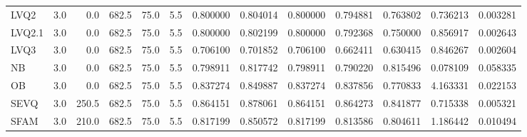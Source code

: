 \begin{table}[H]
\begin{tabular}{lrrrrrrrrrrrr}
LVQ2      &                3.0 &                   0.0 &       682.5 &       75.0 &     5.5 &  0.800000 &   0.804014 &  0.800000 &  0.794881 &  0.763802 &    0.736213 &   0.003281 \\
LVQ2.1    &                3.0 &                   0.0 &       682.5 &       75.0 &     5.5 &  0.800000 &   0.802199 &  0.800000 &  0.792368 &  0.750000 &    0.856917 &   0.002643 \\
LVQ3      &                3.0 &                   0.0 &       682.5 &       75.0 &     5.5 &  0.706100 &   0.701852 &  0.706100 &  0.662411 &  0.630415 &    0.846267 &   0.002604 \\
NB        &                3.0 &                   0.0 &       682.5 &       75.0 &     5.5 &  0.798911 &   0.817742 &  0.798911 &  0.790220 &  0.815496 &    0.078109 &   0.058335 \\
OB        &                3.0 &                   0.0 &       682.5 &       75.0 &     5.5 &  0.837274 &   0.849887 &  0.837274 &  0.837856 &  0.770833 &    4.163331 &   0.022153 \\
SEVQ      &                3.0 &                 250.5 &       682.5 &       75.0 &     5.5 &  0.864151 &   0.878061 &  0.864151 &  0.864273 &  0.841877 &    0.715338 &   0.005321 \\
SFAM      &                3.0 &                 210.0 &       682.5 &       75.0 &     5.5 &  0.817199 &   0.850572 &  0.817199 &  0.813586 &  0.804611 &    1.186442 &   0.010494 \\
\hline
\end{tabular}
\end{table}

